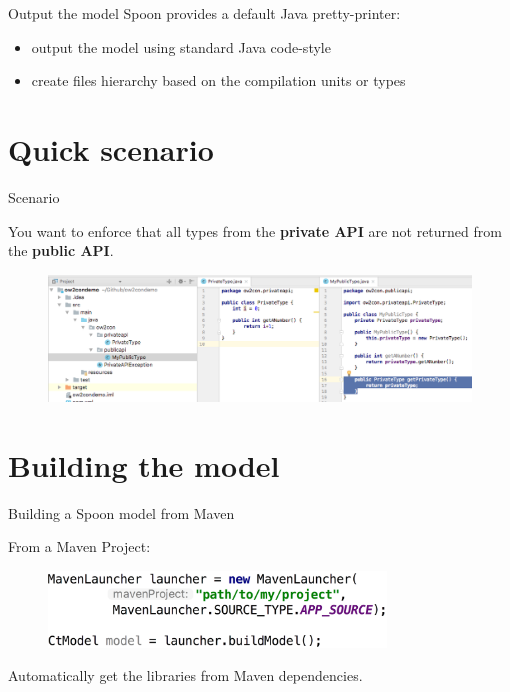 \documentclass{beamer}
\begin{document}
\begin{frame}{Output the model}
Spoon provides a default Java pretty-printer:
\begin{itemize}
\item output the model using standard Java code-style
\item create files hierarchy based on the compilation units or types
\end{itemize} 
\end{frame}

\section{Quick scenario}

\begin{frame}{Scenario}

You want to enforce that all types from the \textbf{private API} are not returned from the \textbf{public API}.

\begin{figure}
\centering
\includegraphics[width=\textwidth]{figures/scenario.png}
\end{figure}

\end{frame}

\section{Building the model}

\begin{frame}[t]{Building a Spoon model from Maven}

From a Maven Project:
\begin{figure}
\centering
\includegraphics[width=0.8\textwidth]{figures/build/maven-launcher.pdf}
\end{figure}

Automatically get the libraries from Maven dependencies.
\end{frame}
\end{document}
